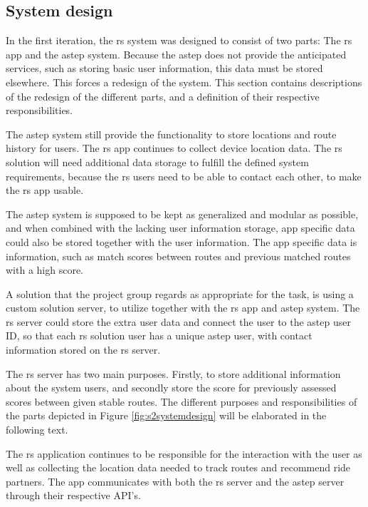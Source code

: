 \subsection{System design}
In the first iteration, the \gls{rs} system was designed to consist of two parts: The \gls{rs} app and the \gls{astep} system.
Because the \gls{astep} does not provide the anticipated services, such as storing basic user information, this data must be stored elsewhere.
This forces a redesign of the system.
This section contains descriptions of the redesign of the different parts, and a definition of their respective responsibilities.


The \gls{astep} system still provide the functionality to store locations and route history for users.
The \gls{rs} app continues to collect device location data.  
The \gls{rs} solution will need additional data storage to fulfill the defined system requirements, because the \gls{rs} users need to be able to contact each other, to make the \gls{rs} app usable.


The \gls{astep} system is supposed to be kept as generalized and modular as possible, and when combined with the lacking user information storage, app specific data could also be stored together with the user information.
The app specific data is information, such as match scores between routes and previous matched routes with a high score.


A solution that the project group regards as appropriate for the task, is using a custom solution server, to utilize together with the \gls{rs} app and \gls{astep} system.
The \gls{rs} server could store the extra user data and connect the user to the \gls{astep} user ID, so that each \gls{rs} solution user has a unique \gls{astep} user, with contact information stored on the \gls{rs} server.


The \gls{rs} server has two main purposes.
Firstly, to store additional information about the system users, and secondly store the score for previously assessed scores between given stable routes.
The different purposes and responsibilities of the parts depicted in Figure \ref{fig:s2systemdesign} will be elaborated in the following text.


The \gls{rs} application continues to be responsible for the interaction with the user as well as collecting the location data needed to track routes and recommend ride partners.
The app communicates with both the \gls{rs} server and the \gls{astep} server through their respective API's.


